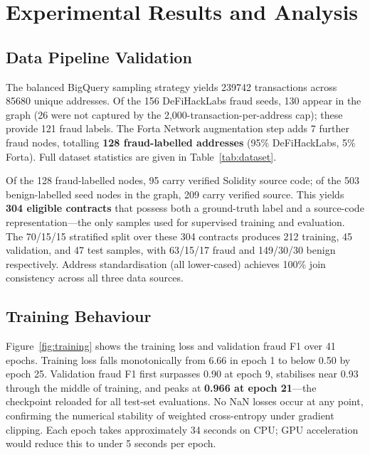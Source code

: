 \section{Experimental Results and Analysis}
\label{sec:results}

\subsection{Data Pipeline Validation}

The balanced BigQuery sampling strategy yields \num{239742} transactions
across \num{85680} unique addresses.
Of the 156 DeFiHackLabs fraud seeds, 130 appear in the graph (26 were
not captured by the 2,000-transaction-per-address cap); these provide
121 fraud labels.  The Forta Network augmentation step adds 7 further
fraud nodes, totalling \textbf{128 fraud-labelled addresses}
(95\% DeFiHackLabs, 5\% Forta).  Full dataset statistics are given
in Table~\ref{tab:dataset}.

Of the 128 fraud-labelled nodes, 95 carry verified Solidity source code;
of the 503 benign-labelled seed nodes in the graph, 209 carry verified
source.  This yields \textbf{304 eligible contracts} that possess both
a ground-truth label and a source-code representation---the only samples
used for supervised training and evaluation.  The 70/15/15 stratified
split over these 304 contracts produces 212 training, 45 validation, and
47 test samples, with 63/15/17 fraud and 149/30/30 benign respectively.
Address standardisation (all lower-cased) achieves 100\% join consistency
across all three data sources.

\subsection{Training Behaviour}

Figure~\ref{fig:training} shows the training loss and validation fraud
F1 over 41 epochs.  Training loss falls monotonically from 6.66 in
epoch 1 to below 0.50 by epoch 25.  Validation fraud F1 first surpasses
0.90 at epoch 9, stabilises near 0.93 through the middle of training,
and peaks at \textbf{0.966 at epoch 21}---the checkpoint reloaded for
all test-set evaluations.  No NaN losses occur at any point, confirming
the numerical stability of weighted cross-entropy under gradient
clipping.  Each epoch takes approximately 34 seconds on CPU; GPU
acceleration would reduce this to under 5 seconds per epoch.

